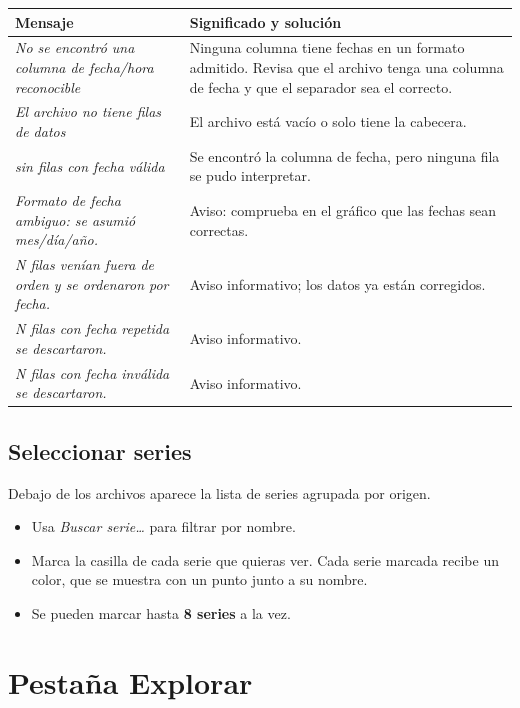 \documentclass[11pt,a4paper,oneside]{report}
\newcommand{\campo}[1]{\textsf{\textit{#1}}}
\begin{document}
\begin{center}
\begin{tabularx}{\textwidth}{L{6.2cm}X}
  \toprule
  Mensaje & Significado y solución \\
  \midrule
  \emph{No se encontró una columna de fecha/hora reconocible} &
    Ninguna columna tiene fechas en un formato admitido. Revisa que el archivo
    tenga una columna de fecha y que el separador sea el correcto. \\
  \emph{El archivo no tiene filas de datos} &
    El archivo está vacío o solo tiene la cabecera. \\
  \emph{sin filas con fecha válida} &
    Se encontró la columna de fecha, pero ninguna fila se pudo interpretar. \\
  \emph{Formato de fecha ambiguo: se asumió mes/día/año.} &
    Aviso: comprueba en el gráfico que las fechas sean correctas. \\
  \emph{N filas venían fuera de orden y se ordenaron por fecha.} &
    Aviso informativo; los datos ya están corregidos. \\
  \emph{N filas con fecha repetida se descartaron.} &
    Aviso informativo. \\
  \emph{N filas con fecha inválida se descartaron.} &
    Aviso informativo. \\
  \bottomrule
\end{tabularx}
\end{center}

\section{Seleccionar series}

Debajo de los archivos aparece la lista de series agrupada por origen.

\begin{itemize}
  \item Usa \campo{Buscar serie\ldots} para filtrar por nombre.
  \item Marca la casilla de cada serie que quieras ver. Cada serie marcada
        recibe un color, que se muestra con un punto junto a su nombre.
  \item Se pueden marcar hasta \textbf{8 series} a la vez.
\end{itemize}

\chapter{Pestaña Explorar}
\end{document}
